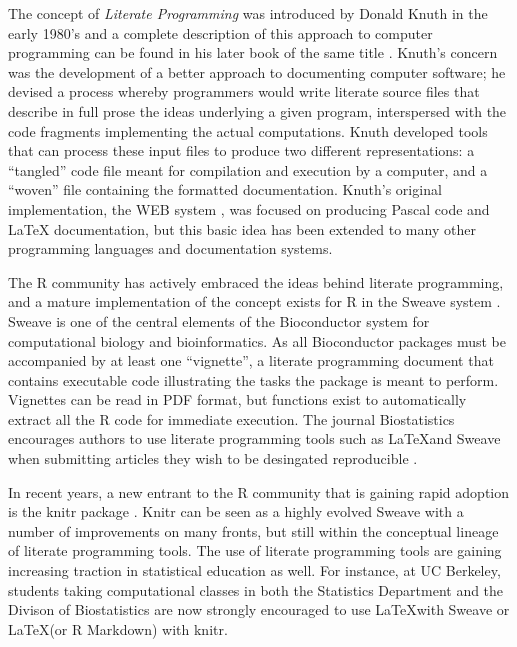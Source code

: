 \documentclass[ChapterTOCs,krantz2]{krantz} %
\theoremstyle{definition}
\begin{document}
The concept of \emph{Literate Programming} was introduced by Donald Knuth in
the early 1980's \cite{Knuth:1983:LP} and a complete description of this
approach to computer programming can be found in his later book of the same
title \cite{Knuth92}.  Knuth's concern was the development of a better approach
to documenting computer software; he devised a process whereby programmers
would write literate source files that describe in full prose the ideas
underlying a given program, interspersed with the code fragments implementing
the actual computations.  Knuth developed tools that can process these input
files to produce two different representations: a ``tangled'' code file meant
for compilation and execution by a computer, and a ``woven'' file containing
the formatted documentation.  Knuth's original implementation, the WEB system
\cite{Knuth:1983:WSS}, was focused on producing Pascal code and \LaTeX
documentation, but this basic idea has been extended to many other programming
languages and documentation systems.  

The R community has actively embraced the ideas behind literate programming,
and a mature implementation of the concept exists for R in the Sweave system
\cite{lmucs-papers:Leisch:2002}.  Sweave is one of the central elements of the
Bioconductor system \cite{Gentleman2004, Dudoit2003} for computational biology
and bioinformatics.  As all Bioconductor packages must be accompanied by at
least one ``vignette'', a literate programming document that contains
executable code illustrating the tasks the package is meant to perform.
Vignettes can be read in PDF format, but functions exist to automatically
extract all the R code for immediate execution.  The journal Biostatistics
encourages authors to use literate programming tools such as \LaTeX and Sweave
when submitting articles they wish to be desingated reproducible \cite{Peng01072009}.

In recent years, a new entrant to the R community that is gaining rapid
adoption is the knitr package \cite{xie2012knitr}.  Knitr can be seen as a
highly evolved Sweave with a number of improvements on many fronts, but still
within the conceptual lineage of literate programming tools.  The use of
literate programming tools are gaining increasing traction in statistical
education as well.  For instance, at UC Berkeley, students taking computational
classes in both the Statistics Department and the Divison of Biostatistics are
now strongly encouraged to use \LaTeX with Sweave or \LaTeX (or R Markdown) with 
knitr.
\end{document}
